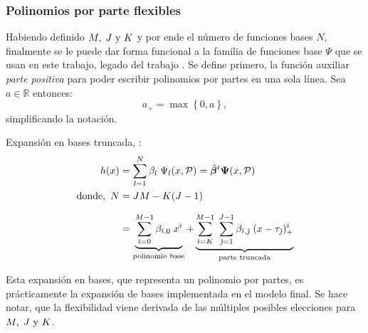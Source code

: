 \documentclass[../Main/Main.tex]{subfiles}
\begin{document}
\subsubsection*{Polinomios por parte flexibles} 
Habiendo definido $M,\;J\text{ y }K$ y por ende el número de funciones bases $N$, finalmente se le puede dar forma funcional a la familia de funciones base $\Psi$ que se usan en este trabajo, legado del trabajo \citet{mallik1998automatic}. Se define primero, la función auxiliar \textit{parte positiva} para poder escribir polinomios por partes en una sola línea. Sea $a \in \mathbb{R}$ entonces:
$$ a_+ = \max\left\{0,a\right\},$$
simplificando la notación. \\

\begin{definition} Expansión en bases truncada, \citet{mallik1998automatic}:
\begin{align}
	h(x) &= \sum_{l = 1}^{N} \beta_l \; \Psi_l(x,\mathcal{P}) = \tilde{\bm{\beta}}^t\bm{\Psi}(x,\mathcal{P})\label{ec:ExpBase_NEstrella} \\ 
	\text{donde, } \, N &= JM - K(J-1) \nonumber \\[7pt]
 		 &=	\underbrace{
	        \sum_{\hat{\imath} = 0}^{M - 1} \beta_{\hat{\imath},0} \; x^{\hat{\imath}}
 		    }_\text{polinomio base} + 
			\underbrace{
			\sum_{\hat{\imath} = K}^{M-1} \;
	 		\sum_{\hat{\jmath} = 1}^{J-1}\beta_{\hat{\imath},\hat{\jmath}}\;(x - \tau_{\hat{\jmath}})_+^{\hat{\imath}}
	 		}_\text{parte truncada}
	 			\label{ec:PoliMallik}
\end{align}
\end{definition}
Esta expansión en bases, que representa un polinomio por partes, es prácticamente la expansión de bases implementada en el modelo final. Se hace notar, que la flexibilidad viene derivada de las múltiples posibles elecciones para $M,\;J\text{ y }K$.
\end{document}
